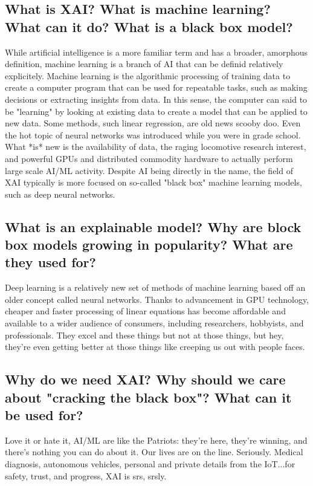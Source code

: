 \documentclass{IEEEtran}
\begin{document}
\subsection{What is XAI?  What is machine learning? What can it do?  What is a black box model?}

While artificial intelligence is a more familiar term and has a broader, amorphous definition, machine learning is a branch of AI that can be definid relatively explicitely.  Machine learning is the algorithmic processing of training data to create a computer program that can be used for repeatable tasks, such as making decisions or extracting insights from data.  In this sense, the computer can said to be "learning" by looking at existing data to create a model that can be applied to new data.  Some methods, such linear regression, are old news scooby doo.  Even the hot topic of neural networks was introduced while you were in grade school.  What *is* new is the availability of data, the raging locomotive research interest, and powerful GPUs and distributed commodity hardware to actually perform large scale AI/ML activity.  Despite AI being directly in the name, the field of XAI typically is more focused on so-called "black box" machine learning models, such as deep neural networks.  

\subsection{What is an explainable model?  Why are block box models growing in popularity?  What are they used for?}

Deep learning is a relatively new set of methods of machine learning based off an older concept called neural networks.  Thanks to advancement in GPU technology, cheaper and faster processing of linear equations has become affordable and available to a wider audience of consumers, including researchers, hobbyists, and professionals.  They excel and these things but not at those things, but hey, they're even getting better at those things like creeping us out with people faces.

\subsection{Why do we need XAI?  Why should we care about "cracking the black box"?  What can it be used for?}

Love it or hate it, AI/ML are like the Patriots:  they're here, they're winning, and there's nothing you can do about it.  Our lives are on the line.  Seriously.  Medical diagnosis, autonomous vehicles, personal and private details from the IoT...for safety, trust, and progress, XAI is srs, srsly.  
\end{document}
